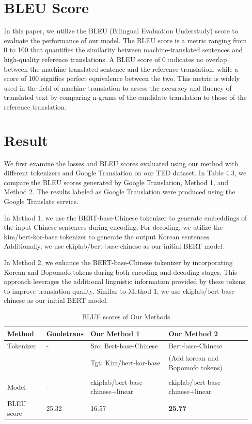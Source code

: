 \documentclass[PhD]{PHlab-thesis}
\begin{document}
\section{BLEU Score}
In this paper, we utilize the BLEU (Bilingual Evaluation Understudy) score\cite{papineni-etal-2002-bleu} to evaluate the performance of our model. The BLEU score is a metric ranging from 0 to 100 that quantifies the similarity between machine-translated sentences and high-quality reference translations. A BLEU score of 0 indicates no overlap between the machine-translated sentence and the reference translation, while a score of 100 signifies perfect equivalence between the two. This metric is widely used in the field of machine translation to assess the accuracy and fluency of translated text by comparing n-grams of the candidate translation to those of the reference translation.

\section{Result}
We first examine the losses and BLEU scores evaluated using our method with different tokenizers and Google Translation on our TED dataset. In Table 4.3, we compare the BLEU scores generated by Google Translation, Method 1, and Method 2. The results labeled as Google Translation were produced using the Google Translate service.

In Method 1, we use the BERT-base-Chinese tokenizer to generate embeddings of the input Chinese sentences during encoding. For decoding, we utilize the kim/bert-kor-base tokenizer to generate the output Korean sentences. Additionally, we use ckiplab/bert-base-chinese as our initial BERT model.

In Method 2, we enhance the BERT-base-Chinese tokenizer by incorporating Korean and Bopomofo tokens during both encoding and decoding stages. This approach leverages the additional linguistic information provided by these tokens to improve translation quality. Similar to Method 1, we use ckiplab/bert-base-chinese as our initial BERT model.

\begin{table}
\begin{tabularx}{0.9\linewidth}{p{3cm} p{2cm} p{4cm} p{4cm}}
Method & Gooletrans & Our Method 1 & Our Method 2\\
\toprule
Tokenizer &  - & Src: Bert-base-Chinese 
 & Bert-base-Chinese\\
&& Tgt: Kim/bert-kor-base & (Add korean and Bopomofo tokens)
\\[.3ex]
\\
Model  &   - & ckiplab/bert-base-chinese+linear & ckiplab/bert-base-chinese+linear
 \\[.3ex]
\toprule
BLEU score  &  25.32 & 16.57 & \textbf{25.77}\\
\bottomrule
\end{tabularx}
\caption{BLUE scores of Our Methods}
\label{tab:notation}
\end{table}
\end{document}
